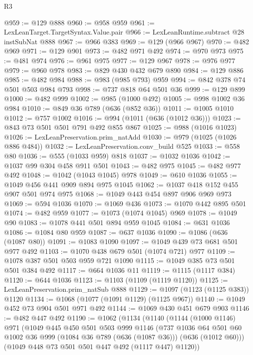 \begin{lexlean}{R3}
\begin{coremodule}
{{{{{{{{{{{{{{{{{{{{{{{{{{@959 := @129 @888
@960 := @958 @959
@961 := LexLeanTarget.TargetSyntax.Value.pair
@966 := LexLeanRuntime.subtract @28 instSubNat @888
@967 := @966 @383
@969 := @129 (@966 @967)
@970 := @482 @969
@971 := @129 @901
@973 := @482 @971 @492
@974 := @970 @973
@975 := @481 @974
@976 := @961 @975
@977 := @129 @967
@978 := @976 @977
@979 := @960 @978
@983 := @829 @430 @432 @679 @890
@984 := @129 @886
@985 := @482 @984
@988 := @983 (@985 @793) @959
@994 := @842 @378 @74 @501 @503 @984 @793
@998 := @737 @818 @64 @501 @36
@999 := @129 @899
@1000 := @482 @999
@1002 := @985 (@1000 @492)
@1005 := @998 @1002 @36 @984
@1010 := @849 @36 @789 (@636 (@852 @36))
@1011 := @1005 @1010
@1012 := @757 @1002
@1016 := @994 (@1011 (@636 (@1012 @36)))
@1023 := @843 @73 @501 @501 @791 @492 @855 @867
@1025 := @988 (@1016 @1023)
@1026 := LexLeanPreservation.prim_natAdd
@1030 := @979 (@1025 (@1026 @886 @484))
@1032 := LexLeanPreservation.conv_build @525
@1033 := @558 @80
@1036 := @555 (@1033 @959) @818
@1037 := @1032 @1036
@1042 := @1037 @99 @304 @458 @911 @501
@1043 := @482 @975
@1045 := @482 @977 @492
@1048 := @1042 (@1043 @1045) @978
@1049 := @610 @1036
@1055 := @1049 @456 @441 @909 @894 @975 @1045
@1062 := @1037 @418 @152 @455 @907 @501 @974 @975
@1068 := @1049 @443 @454 @897 @906 @969 @973
@1069 := @594 @1036
@1070 := @1069 @436
@1073 := @1070 @442 @895 @501
@1074 := @482 @959
@1077 := @1073 (@1074 @1045) @969
@1078 := @1049 @90
@1083 := @1078 @441 @501 @894 @959 @1045
@1084 := @631 @1036
@1086 := @1084 @80 @959
@1087 := @637 @1036
@1090 := @1086 (@636 (@1087 @80))
@1091 := @1083 @1090
@1097 := @1049 @439 @73 @681 @501 @977 @492
@1103 := @1070 @438 @679 @501 (@1074 @721) @977
@1109 := @1078 @387 @501 @503 @959 @721 @1090
@1115 := @1049 @385 @73 @501 @501 @384 @492
@1117 := @664 @1036 @11
@1119 := @1115 (@1117 @384)
@1120 := @644 @1036
@1123 := @1103 (@1109 (@1119 @1120))
@1125 := LexLeanPreservation.prim_natSub @888
@1129 := @1097 (@1123 (@1125 @383)) @1120
@1134 := @1068 (@1077 (@1091 @1129) (@1125 @967))
@1140 := @1049 @452 @73 @904 @501 @971 @492
@1144 := @1069 @430 @451 @679 @903
@1146 := @482 @447 @492
@1190 := @1062
    (@1134
      (@1140
        (@1144
          (@1000 @1146)
          @971
          (@1049
            @445
            @450
            @501
            @503
            @999
            @1146
            (@737
              @1036
              @64
              @501
              @60
              @1002
              @36
              @999
              (@1084 @36 @789 (@636 (@1087 @36)))
              (@636 (@1012 @60)))
            (@1049 @448 @73 @501 @501 @447 @492 (@1117 @447) @1120))
}}}}}}}}}}}}}}}}}}}}}}}}}}
\end{coremodule}
\end{lexlean}
